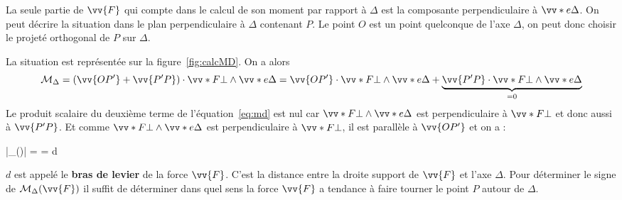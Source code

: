 \documentclass{cours}
\begin{document}
La seule partie de $\vv{F}$ qui compte dans le calcul de son moment par rapport à $\Delta$ est la composante perpendiculaire à $\vv*{e}{\Delta}$. On peut décrire la situation dans le plan perpendiculaire à $\Delta$ contenant $P$. Le point $O$ est un point quelconque de l'axe $\Delta$, on peut donc choisir le projeté orthogonal de $P$ sur $\Delta$. 

\begin{center}
\label{fig:calcMD}
\end{center}
%
La situation est représentée sur la figure~\ref{fig:calcMD}. On a alors
\begin{equation}
  \M_\Delta = (\vv{OP'} + \vv{P'P})\cdot\Fo\wedge\vv*{e}{\Delta} = \vv{OP'}\cdot\Fo\wedge\vv*{e}{\Delta} + \underbrace{\vv{P'P}\cdot\Fo\wedge\vv*{e}{\Delta}}_{=0} 
\label{eq:md}
\end{equation}
%
Le produit scalaire du deuxième terme de l'équation~\eqref{eq:md} est nul car $\Fo\wedge\vv*{e}{\Delta}$ est perpendiculaire à $\Fo$ et donc aussi à $\vv{P'P}$. Et comme $\Fo\wedge\vv*{e}{\Delta}$ est perpendiculaire à $\Fo$, il est parallèle à $\vv{OP'}$ et on a :

\begin{eqencadre}
  \left|\M_\Delta()\right| =  = d\times\norm{\Fo} 
\end{eqencadre}
%
$d$ est appelé le \textbf{bras de levier} de la force $\vv{F}$. C'est la distance entre la droite support de $\vv{F}$ et l'axe $\Delta$.  Pour déterminer le signe de $\M_\Delta(\vv{F})$ il suffit de déterminer dans quel sens la force $\vv{F}$ a tendance à faire tourner le point $P$ autour de $\Delta$. 
\end{document}
